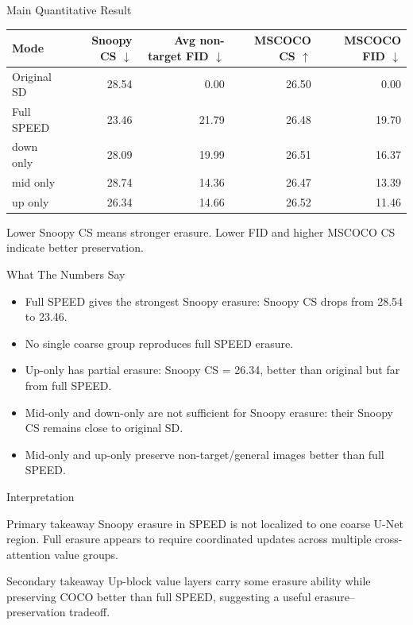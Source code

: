 \documentclass[aspectratio=169,11pt]{beamer}
\newcommand{\good}[1]{\textcolor{teal!70!black}{#1}}
\begin{document}
\begin{frame}{Main Quantitative Result}
  \small
  \begin{table}
    \centering
    \begin{tabular}{lrrrr}
      \toprule
      Mode & Snoopy CS $\downarrow$ & Avg non-target FID $\downarrow$ & MSCOCO CS $\uparrow$ & MSCOCO FID $\downarrow$ \\
      \midrule
      Original SD & 28.54 & 0.00 & 26.50 & 0.00 \\
      Full SPEED & \good{23.46} & 21.79 & 26.48 & 19.70 \\
      down only & 28.09 & 19.99 & \good{26.51} & 16.37 \\
      mid only & 28.74 & \good{14.36} & 26.47 & 13.39 \\
      up only & 26.34 & 14.66 & \good{26.52} & \good{11.46} \\
      \bottomrule
    \end{tabular}
  \end{table}

  \vspace{0.5em}
  Lower Snoopy CS means stronger erasure.
  Lower FID and higher MSCOCO CS indicate better preservation.
\end{frame}

\begin{frame}{What The Numbers Say}
  \begin{itemize}
    \item Full SPEED gives the strongest Snoopy erasure:
      Snoopy CS drops from 28.54 to 23.46.
    \item No single coarse group reproduces full SPEED erasure.
    \item Up-only has partial erasure:
      Snoopy CS = 26.34, better than original but far from full SPEED.
    \item Mid-only and down-only are not sufficient for Snoopy erasure:
      their Snoopy CS remains close to original SD.
    \item Mid-only and up-only preserve non-target/general images better than full SPEED.
  \end{itemize}
\end{frame}

\begin{frame}{Interpretation}
  \begin{block}{Primary takeaway}
    Snoopy erasure in SPEED is not localized to one coarse U-Net region.
    Full erasure appears to require coordinated updates across multiple cross-attention value groups.
  \end{block}

  \vspace{0.5em}
  \begin{block}{Secondary takeaway}
    Up-block value layers carry some erasure ability while preserving COCO better than full SPEED,
    suggesting a useful erasure--preservation tradeoff.
  \end{block}
\end{frame}
\end{document}
